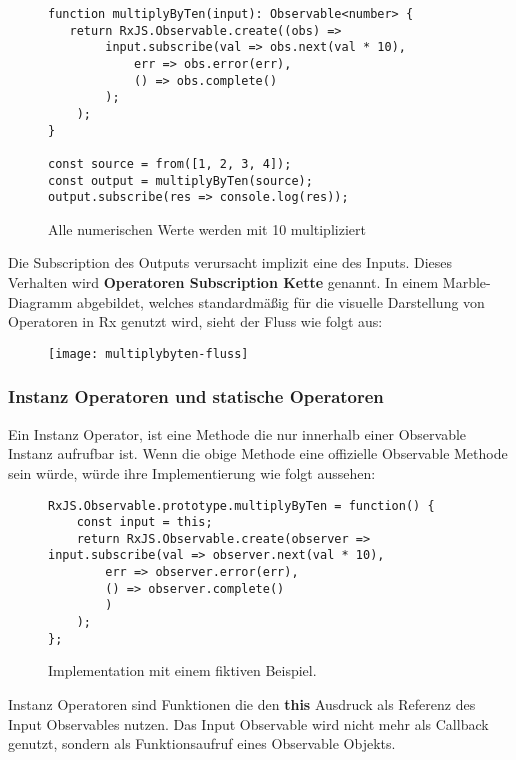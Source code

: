 \begin{figure}[H]
\begin{lstlisting}[basicstyle=\small]
function multiplyByTen(input): Observable<number> {
   return RxJS.Observable.create((obs) =>
        input.subscribe(val => obs.next(val * 10),
            err => obs.error(err),
            () => obs.complete()
        );
    );
}

const source = from([1, 2, 3, 4]);
const output = multiplyByTen(source);
output.subscribe(res => console.log(res));
\end{lstlisting}
\caption{Alle numerischen Werte werden mit 10 multipliziert}
\end{figure}

\noindent
Die Subscription des Outputs verursacht implizit eine des Inputs. Dieses Verhalten wird \textbf{Operatoren Subscription Kette} genannt. In einem Marble-Diagramm abgebildet, welches standardmäßig für die visuelle Darstellung von Operatoren in Rx genutzt wird, sieht der Fluss wie folgt aus:

\begin{figure}[H]
\centering
\texttt{[image: multiplybyten-fluss]}
\end{figure}

\subsubsection{Instanz Operatoren und statische Operatoren}
Ein Instanz Operator, ist eine Methode die nur innerhalb einer Observable Instanz aufrufbar ist. Wenn die obige Methode eine offizielle Observable Methode sein würde, würde ihre Implementierung wie folgt aussehen:

\begin{figure}[H]
\begin{lstlisting}[basicstyle=\small]
RxJS.Observable.prototype.multiplyByTen = function() {
    const input = this;
    return RxJS.Observable.create(observer => input.subscribe(val => observer.next(val * 10),
        err => observer.error(err),
        () => observer.complete()
        )
    );
};
\end{lstlisting}
\caption{Implementation mit einem fiktiven Beispiel.}
\end{figure}

\noindent
Instanz Operatoren sind Funktionen die den \textbf{this} Ausdruck als Referenz des Input Observables nutzen. Das Input Observable wird nicht mehr als Callback genutzt, sondern als Funktionsaufruf eines Observable Objekts.

